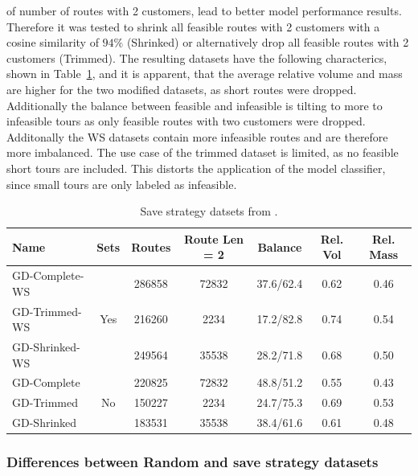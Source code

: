 of number of routes with 2 customers, lead to better model performance results. Therefore it was tested
to shrink all feasible routes with 2 customers with a cosine similarity of $94\%$ (Shrinked) or alternatively drop
all feasible routes with 2 customers (Trimmed).
The resulting datasets have the following characterics, shown in Table~\ref{tab:saved_instances_gendreau}, and it is apparent, that the average relative volume
and mass are higher for the two modified datasets, as short routes were dropped. Additionally the balance between
feasible and infeasible is tilting to more to infeasible tours as only feasible routes with two customers were dropped.
Additonally the WS datasets contain more infeasible routes and are therefore more imbalanced. The use case of the trimmed dataset is limited,
as no feasible short tours are included. This distorts the application of the model classifier, since small tours are only labeled as infeasible.

\begin{table}[!h]
	\centering
	\small
	\begin{tabular}{l c c c c c c }
		\toprule
		Name           & Sets                 & Routes & Route Len = 2 & Balance   & Rel. Vol & Rel. Mass \\
		\midrule
		GD-Complete-WS & \multirow{3}{*}{Yes} & 286858 & 72832         & 37.6/62.4 & 0.62     & 0.46      \\
		GD-Trimmed-WS  &                      & 216260 & 2234          & 17.2/82.8 & 0.74     & 0.54      \\
		GD-Shrinked-WS &                      & 249564 & 35538         & 28.2/71.8 & 0.68     & 0.50      \\        \midrule
		GD-Complete    & \multirow{3}{*}{No}  & 220825 & 72832         & 48.8/51.2 & 0.55     & 0.43      \\
		GD-Trimmed     &                      & 150227 & 2234          & 24.7/75.3 & 0.69     & 0.53      \\
		GD-Shrinked    &                      & 183531 & 35538         & 38.4/61.6 & 0.61     & 0.48      \\
		\bottomrule
	\end{tabular}
	\caption[Save strategy train datsets from \gendreauDataSet.]{Save strategy datsets from \gendreauDataSet.}
	\label{tab:saved_instances_gendreau}
\end{table}

\subsubsection{Differences between Random and save strategy datasets}

